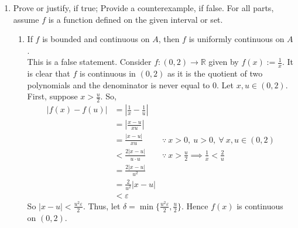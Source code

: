 \documentclass[12pt,letterpaper]{article}
\newcommand{\st}{\ \text{s.t.}\ }
\newcommand{\abs}[1]{\left\lvert #1 \right\rvert}
\newcommand{\R}{\mathbb{R}}
\theoremstyle{case}
\theoremstyle{definition}
\begin{document}
\begin{enumerate}
\begin{enumerate}
			\begin{proof}
				Since $f$ is a contraction, we know that $f$ is Lipschitz with $k \in (0,1)$. This in turn implies that $f$ is continuous.\\
				
				By the \textit{Brower Fixed Point Theorem}, there exists $c \st f(c)=c$. We want to show the uniqueness of this point.\\
				
				Assume that there exists $c_1,c_2 \st f(c_1)=c_1$ and $f(c_2)=c_2$, and $c_1 \neq c_2$.\\
				
				Assume without loss of generality that $c_1<c_2$.\\
			
				Consider the interval $[c_1,c_2]\leq[a,b]$. Since $f$ is a contraction, we have that
				\[|f(c_1)-f(c_2)|\leq K|c_1-c_2|<|c_1-c_2|\]
				Thus we have that $|c_1-c_2|\leq|c_1-c_2|$, which is a contradiction. Thus if $f$ is a contraction, then $f$ has a unique fixed point $c$ satisfying $f(c)=c$.\\
			\end{proof}
		\end{enumerate}
		\item Prove or justify, if true; Provide a counterexample, if false. For all parts, assume $f$ is a function defined on the given interval or set.
		\begin{enumerate}
			\item If $f$ is bounded and continuous on $A$, then $f$ is uniformly continuous on $A$.\\
			
			This is a false statement. Consider $f:(0,2) \to \R$ given by $f(x):=\frac{1}{x}$. It is clear that $f$ is continuous in $(0,2)$ as it is the quotient of two polynomials and the denominator is never equal to 0. Let $x,u \in (0,2)$. First, suppose $x > \frac{u}{2}$. So,
			\begin{align*}
				|f(x)-f(u)| &= \abs{\frac{1}{x}-\frac{1}{u}} \\
				&= \abs{\frac{x-u}{xu}} \\
				&= \frac{|x-u|}{xu} &\because\ x > 0,\ u>0,\ \forall\ x,u \in (0,2) \\
				&< \frac{2|x-u|}{u \cdot u} &\because\ x > \frac{u}{2} \implies \frac{1}{x} < \frac{2}{u} \\
				&= \frac{2|x-u|}{u^2} \\
				&= \frac{2}{u^2}|x-u| \\
				&< \varepsilon
			\end{align*}
			So $|x-u| < \frac{u^2\varepsilon}{2}$. Thus, let $\delta=\min\{\frac{u^2\varepsilon}{2},\frac{u}{2}\}$. Hence $f(x)$ is continuous on $(0,2)$.\\
			

\end{enumerate}
\end{enumerate}
\end{document}
